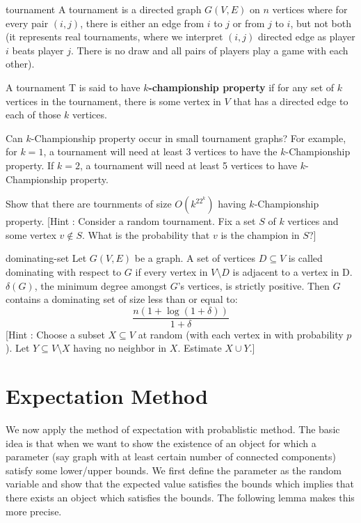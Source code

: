 \begin{exercise-prob}
\begin{show-ps2}{tournament}
A tournament is a directed graph $G(V,E)$ on $n$ vertices where for every pair $(i,j)$, there is either an edge from $i$ to $j$ or from $j$ to $i$, but not both (it represents real tournaments, where we interpret $(i,j)$ directed edge as player $i$ beats player $j$. There is no draw and all pairs of players play a game with each other). 

A tournament T is said to have \textbf{$k$-championship property} if for any set of $k$ vertices in the tournament, there is some vertex in $V$ that has a directed edge to each of those $k$ vertices.

Can $k$-Championship property occur in small tournament graphs? For example, for $k=1$, a tournament will need at least $3$ vertices to have the $k$-Championship property. If $k=2$, a tournament will need at least 5 vertices to have $k$-Championship property.

Show that there are tournments of size $O(k^22^k)$ having $k$-Championship property. [Hint : Consider a random tournament. Fix a set $S$ of $k$ vertices and some vertex $v \notin S$. What is the probability that $v$ is the champion in $S$?]
\end{show-ps2}
\end{exercise-prob}

\begin{exercise-prob}
\begin{show-ps2}{dominating-set}
Let $G(V,E)$ be a graph. A set of vertices $D \subseteq V$ is called dominating
with respect to $G$ if every vertex in $V \setminus D$ is adjacent to a vertex in D. $\delta(G)$, the minimum degree amongst $G$’s vertices, is strictly positive. Then $G$ contains a dominating set of size less than or equal to:
$$ \frac{n(1+\log(1+\delta))}{1+\delta} $$
[Hint : Choose a subset $X\subseteq V$ at random (with each vertex in with probability $p$). Let $Y \subseteq V\setminus X$ having no neighbor in $X$. Estimate $X \cup Y$.]
\end{show-ps2}
\end{exercise-prob}

\section{Expectation Method}

We now apply the method of expectation with probablistic method. The basic idea is that when we
want to show the existence of an object for which a parameter (say graph with at least certain number of connected components) satisfy some lower/upper bounds. We first define the parameter as the random variable and show that the expected value satisfies the bounds which implies that there exists an object which satisfies the bounds. The following lemma makes this more precise.

